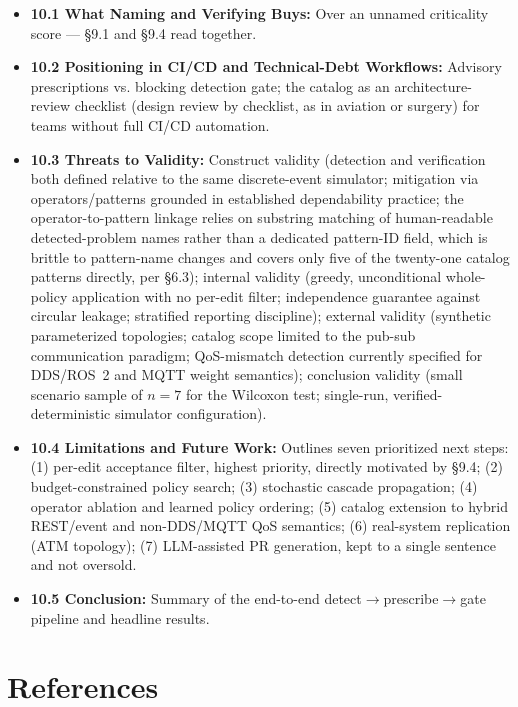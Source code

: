 \documentclass[11pt]{article}
\begin{document}
\begin{itemize}[leftmargin=*]
\item \textbf{10.1 What Naming and Verifying Buys:} Over an unnamed criticality score --- \S9.1 and
  \S9.4 read together.
\item \textbf{10.2 Positioning in CI/CD and Technical-Debt Workflows:} Advisory prescriptions vs.
  blocking detection gate; the catalog as an architecture-review checklist (design review by
  checklist, as in aviation or surgery) for teams without full CI/CD automation.
\item \textbf{10.3 Threats to Validity:} Construct validity (detection and verification both defined
  relative to the same discrete-event simulator; mitigation via operators/patterns grounded in
  established dependability practice; the operator-to-pattern linkage relies on substring matching of
  human-readable detected-problem names rather than a dedicated pattern-ID field, which is brittle to
  pattern-name changes and covers only five of the twenty-one catalog patterns directly, per \S6.3);
  internal validity (greedy, unconditional whole-policy application with no per-edit filter;
  independence guarantee against circular leakage; stratified reporting discipline); external
  validity (synthetic parameterized topologies; catalog scope limited to the pub-sub communication
  paradigm; QoS-mismatch detection currently specified for DDS/ROS~2 and MQTT weight semantics);
  conclusion validity (small scenario sample of $n=7$ for the Wilcoxon test; single-run,
  verified-deterministic simulator configuration).
\item \textbf{10.4 Limitations and Future Work:} Outlines seven prioritized next steps: (1) per-edit
  acceptance filter, highest priority, directly motivated by \S9.4; (2) budget-constrained policy
  search; (3) stochastic cascade propagation; (4) operator ablation and learned policy ordering; (5)
  catalog extension to hybrid REST/event and non-DDS/MQTT QoS semantics; (6) real-system replication
  (ATM topology); (7) LLM-assisted PR generation, kept to a single sentence and not oversold.
\item \textbf{10.5 Conclusion:} Summary of the end-to-end detect$\to$prescribe$\to$gate pipeline and
  headline results.
\end{itemize}

\section*{References}
\end{document}
